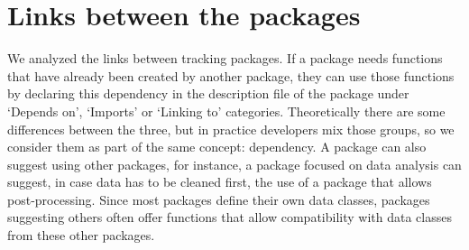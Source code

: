 \documentclass[a4paper,12pt]{article}
\newcommand{\Rpkg}[1]{\texttt{#1}}
\begin{document}
%
%
%

\section*{Links between the packages}
\label{section:links}

We analyzed the links between tracking packages. If a package needs functions that have already been created by another package, they can use those functions by declaring this dependency in the description file of the package under `Depends on', `Imports' or `Linking to' categories. Theoretically there are some differences between the three, but in practice developers mix those groups, so we consider them as part of the same concept: dependency. A package can also suggest using other packages, for instance, a package focused on data analysis can suggest, in case data has to be cleaned first, the use of a package that allows post-processing. Since most packages define their own data classes, packages suggesting others often offer functions that allow compatibility with data classes from these other packages. 
\end{document}
